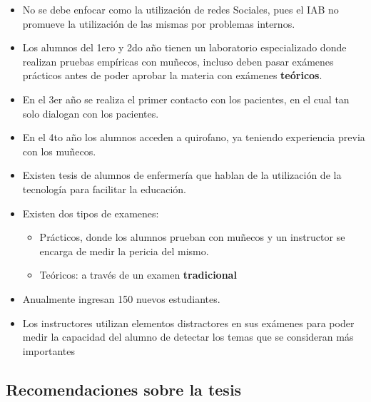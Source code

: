 \begin{itemize}
\itemsep1pt\parskip0pt
\item
  No se debe enfocar como la utilización de redes Sociales, pues el IAB
  no promueve la utilización de las mismas por problemas internos.
\item
  Los alumnos del 1ero y 2do año tienen un laboratorio especializado
  donde realizan pruebas empíricas con muñecos, incluso deben pasar
  exámenes prácticos antes de poder aprobar la materia con exámenes
  \textbf{teóricos}.
\item
  En el 3er año se realiza el primer contacto con los pacientes, en el
  cual tan solo dialogan con los pacientes.
\item
  En el 4to año los alumnos acceden a quirofano, ya teniendo experiencia
  previa con los muñecos.
\item
  Existen tesis de alumnos de enfermería que hablan de la utilización de
  la tecnología para facilitar la educación.
\item
  Existen dos tipos de examenes:

  \begin{itemize}
  \itemsep1pt\parskip0pt
  \item
    Prácticos, donde los alumnos prueban con muñecos y un instructor se
    encarga de medir la pericia del mismo.
  \item
    Teóricos: a través de un examen \textbf{tradicional}
  \end{itemize}
\item
  Anualmente ingresan 150 nuevos estudiantes.
\item
  Los instructores utilizan elementos distractores en sus exámenes para
  poder medir la capacidad del alumno de detectar los temas que se
  consideran más importantes
\end{itemize}

\subsection{Recomendaciones sobre la
tesis}\label{recomendaciones-sobre-la-tesis}

